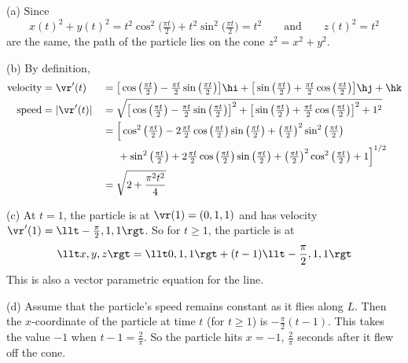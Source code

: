\begin{solution} (a)
Since
\begin{equation*}
x(t)^2+y(t)^2=t^2\cos^2\big(\tfrac{\pi t}{2}\big)
   +t^2\sin^2\big(\tfrac{\pi t}{2}\big)=t^2\qquad\text{and}\qquad
z(t)^2=t^2
\end{equation*}
are the same, the path of the particle lies on the cone $z^2=x^2+y^2$.

(b) By definition,
\begin{alignat*}{3}
\text{velocity}&=\vr'(t)&&= \big[\cos\big(\tfrac{\pi t}{2}\big)
           -\tfrac{\pi t}{2}\sin\big(\tfrac{\pi t}{2}\big)\big]\hi
         +\big[\sin\big(\tfrac{\pi t}{2}\big)
           +\tfrac{\pi t}{2}\cos\big(\tfrac{\pi t}{2}\big)\big]\hj +\hk \\
\text{speed}&=|\vr'(t)|&&=
\sqrt{\big[\cos\big(\tfrac{\pi t}{2}\big)
           -\tfrac{\pi t}{2}\sin\big(\tfrac{\pi t}{2}\big)\big]^2
         +\big[\sin\big(\tfrac{\pi t}{2}\big)
           +\tfrac{\pi t}{2}\cos\big(\tfrac{\pi t}{2}\big)\big]^2 +1^2} \\
& &&=
   \Big[\cos^2\big(\tfrac{\pi t}{2}\big)
          -2\tfrac{\pi t}{2}\cos\big(\tfrac{\pi t}{2}\big)
               \sin\big(\tfrac{\pi t}{2}\big)
           +\big(\tfrac{\pi t}{2}\big)^2\sin^2\big(\tfrac{\pi t}{2}\big) \\
& &&\hskip.2in         +\sin^2\big(\tfrac{\pi t}{2}\big)
           +2\tfrac{\pi t}{2}\cos\big(\tfrac{\pi t}{2}\big)
               \sin\big(\tfrac{\pi t}{2}\big)
  +\big(\tfrac{\pi t}{2}\big)^2\cos^2\big(\tfrac{\pi t}{2}\big) +1\Big]^{1/2}\\
& &&=\sqrt{2+\frac{\pi^2 t^2}{4}}
\end{alignat*}

(c) At $t=1$, the particle is at $\vr(1)=(0,1,1)$ and has velocity
$\vr'(1)=\llt -\frac{\pi}{2},1,1\rgt$. So for $t\ge 1$, the particle 
is at 
\begin{equation*}
   \llt x,y,z\rgt = \llt 0,1,1\rgt+(t-1)\llt -\frac{\pi}{2},1,1\rgt
\end{equation*}
This is also a vector parametric equation for the line.

(d) Assume that the particle's speed remains constant as it flies along $L$.
Then the $x$-coordinate of the particle at time $t$ (for $t\ge 1$)
is  $-\frac{\pi}{2}(t-1)$. This takes the value $-1$ when $t-1=\frac{2}{\pi}$.
So the particle hits $x=-1$, $\frac{2}{\pi}$ seconds after it
flew off the cone.
\end{solution}

